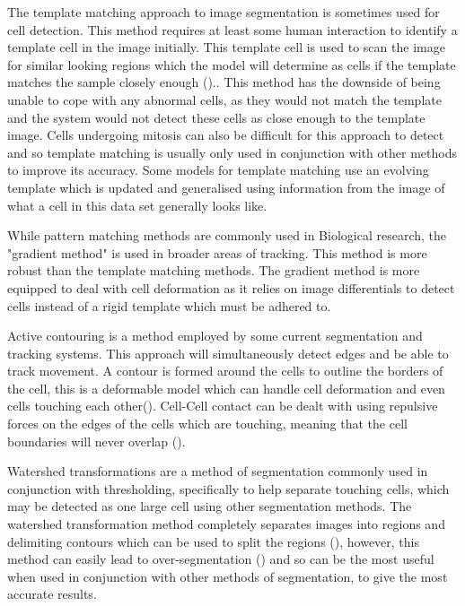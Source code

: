 \documentclass[12pt a4paper]{article}
\begin{document}
        The template matching approach to image segmentation is sometimes used for cell detection. This method requires at least some human interaction to identify a template cell in the image initially. This template cell is used to scan the image for similar looking regions which the model will determine as cells if the template matches the sample closely enough (\cite{MEIJERING2012183}).. This method has the downside of being unable to cope with any abnormal cells, as they would not match the template and the system would not detect these cells as close enough to the template image. Cells undergoing mitosis can also be difficult for this approach to detect and so template matching is usually only used in conjunction with other methods to improve its accuracy. Some models for template matching use an evolving template which is updated and generalised using information from the image of what a cell in this data set generally looks like. 
        
        While pattern matching methods are commonly used in Biological research, the "gradient method" is used in broader areas of tracking. This method is more robust than the template matching methods. The gradient method is more equipped to deal with cell deformation as it relies on image differentials to detect cells instead of a rigid template which must be adhered to.
        
        Active contouring is a method employed by some current segmentation and tracking systems. This approach will simultaneously detect edges and be able to track movement. A contour is formed around the cells to outline the borders of the cell, this is a deformable model which can handle cell deformation and even cells touching each other(\cite{li-et-al}). Cell-Cell contact can be dealt with using repulsive forces on the edges of the cells which are touching, meaning that the cell boundaries will never overlap (\cite{li-et-al}).
        
        Watershed transformations are a method of segmentation commonly used in conjunction with thresholding, specifically to help separate touching cells, which may be detected as one large cell using other segmentation methods. The watershed transformation method completely separates images into regions and delimiting contours which can be used to split the regions (\cite{Awasthi}), however, this method can easily lead to over-segmentation (\cite{chen_zhou_wong_2006}) and so can be the most useful when used in conjunction with other methods of segmentation, to give the most accurate results.
        
\end{document}
